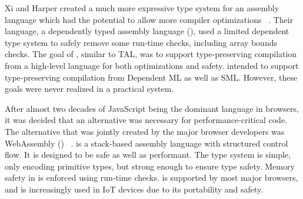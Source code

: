Xi and Harper created a much more expressive type system for an assembly language which had the potential to allow more compiler optimizations ~\cite{dtal}.
Their language, a dependently typed assembly language (\dtal), used a limited dependent type system to safely remove some run-time checks, including array bounds checks.
The goal of \dtal, similar to TAL, was to support type-preserving compilation from a high-level language for both optimizations and safety.
\dtal intended to support type-preserving compilation from Dependent ML as well as SML.
However, these goals were never realized in a practical system.

After almost two decades of JavaScript being the dominant language in browsers, it was decided that an alternative was necessary for performance-critical code.
The alternative that was jointly created by the major browser developers was WebAssembly (\wasm) ~\cite{Wasm}.
\wasm is a stack-based assembly language with structured control flow.
It is designed to be safe as well as performant.
The \wasm type system is simple, only encoding primitive types, but strong enough to ensure type safety.
Memory safety in \wasm is enforced using run-time checks.
\wasm is supported by most major browsers, and is increasingly used in IoT devices due to its portability and safety.